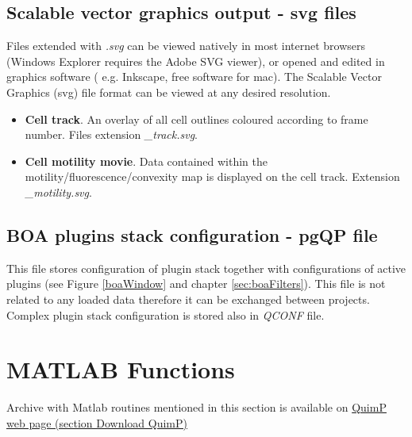 \documentclass[a4paper,12pt]{article}
\begin{document}
\subsection{Scalable vector graphics output - svg files}

Files extended with
\textit{.svg} can be viewed natively in most internet browsers (Windows Explorer requires the Adobe SVG viewer), or opened and edited
in graphics software ( e.g. Inkscape, free software for mac).  The 
Scalable Vector Graphics (svg) file format can be viewed at any desired resolution. 

\begin{itemize}

\item \textbf{Cell track}.  An overlay of all cell outlines coloured according to frame number. Files extension \textit{\_track.svg}.

\item \textbf{Cell motility movie}.  Data contained within the motility/fluorescence/convexity map is displayed on the cell track. Extension \textit{\_motility.svg}.

\end{itemize}

\subsection{BOA plugins stack configuration - pgQP file}

This file stores configuration of plugin stack together with configurations of active plugins (see Figure \ref{boaWindow} and chapter \ref{sec:boaFilters}). This file is not related to any loaded data therefore it can be exchanged between projects. Complex plugin stack configuration is stored also in \textit{QCONF} file. 



\section{MATLAB Functions}
\label{matlab}

Archive with Matlab routines mentioned in this section is available on \href{http://www2.warwick.ac.uk/fac/sci/dcs/people/till_bretschneider/quimp/quimp-download}{QuimP web page (section Download QuimP)}
\end{document}
